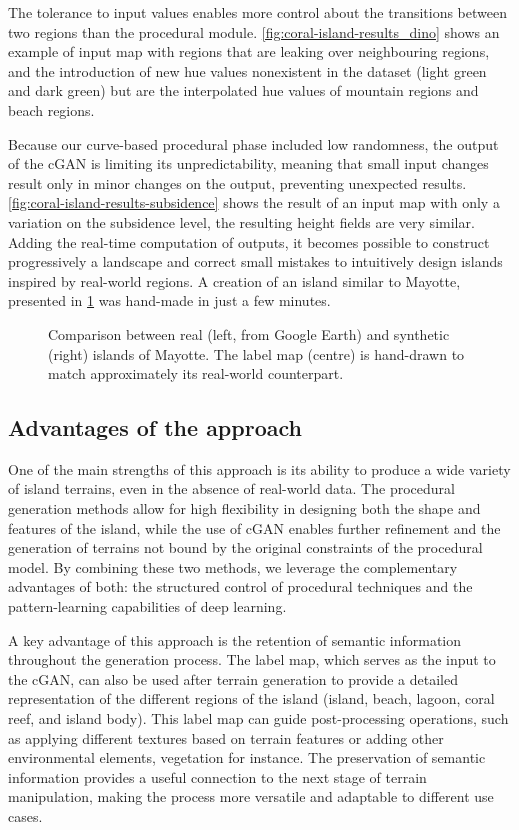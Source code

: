 The tolerance to input values enables more control about the transitions between two regions than the procedural module. \cref{fig:coral-island-results_dino} shows an example of input map with regions that are leaking over neighbouring regions, and the introduction of new hue values nonexistent in the dataset (light green and dark green) but are the interpolated hue values of mountain regions and beach regions.

Because our curve-based procedural phase included low randomness, the output of the cGAN is limiting its unpredictability, meaning that small input changes result only in minor changes on the output, preventing unexpected results. \cref{fig:coral-island-results-subsidence} shows the result of an input map with only a variation on the subsidence level, the resulting height fields are very similar. Adding the real-time computation of outputs, it becomes possible to construct progressively a landscape and correct small mistakes to intuitively design islands inspired by real-world regions. A creation of an island similar to Mayotte, presented in \cref{fig:coral-island-example-Mayotte} was hand-made in just a few minutes.

\begin{figure}
    \caption{Comparison between real (left, from Google Earth) and synthetic (right) islands of Mayotte. The label map (centre) is hand-drawn to match approximately its real-world counterpart.}
    \label{fig:coral-island-example-Mayotte}
\end{figure}


\subsection{Advantages of the approach}
\label{sec:coral-island-advantages}

One of the main strengths of this approach is its ability to produce a wide variety of island terrains, even in the absence of real-world data. The procedural generation methods allow for high flexibility in designing both the shape and features of the island, while the use of cGAN enables further refinement and the generation of terrains not bound by the original constraints of the procedural model. By combining these two methods, we leverage the complementary advantages of both: the structured control of procedural techniques and the pattern-learning capabilities of deep learning.

A key advantage of this approach is the retention of semantic information throughout the generation process. The label map, which serves as the input to the cGAN, can also be used after terrain generation to provide a detailed representation of the different regions of the island (island, beach, lagoon, coral reef, and island body). This label map can guide post-processing operations, such as applying different textures based on terrain features or adding other environmental elements, vegetation for instance. The preservation of semantic information provides a useful connection to the next stage of terrain manipulation, making the process more versatile and adaptable to different use cases.


